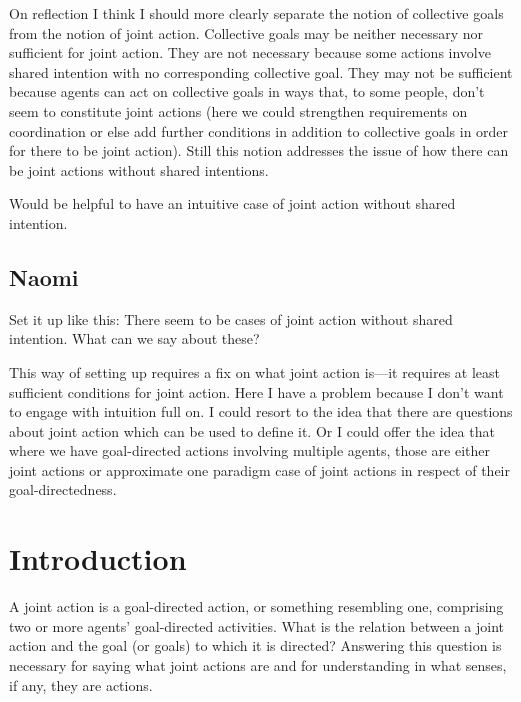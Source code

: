 \documentclass[12pt,a4paper]{extarticle}
\begin{document}
On reflection I think I should more clearly separate the notion of collective goals from the notion of joint action.
Collective goals may be neither necessary nor sufficient for joint action.
They are not necessary because some actions involve shared intention with no corresponding collective goal.
They may not be sufficient because agents can act on collective goals in ways that, to some people, don't seem to constitute joint actions (here we could strengthen requirements on coordination or else add further conditions in addition to collective goals in order for there to be joint action).
Still this notion addresses the issue of how there can be joint actions without shared intentions.

Would be helpful to have an intuitive case of joint action without shared intention.


\subsection{Naomi}
Set it up like this: 
There seem to be cases of joint action without shared intention.  
What can we say about these?

This way of setting up requires a fix on what joint action is---it requires at least sufficient conditions for joint action.
Here I have a problem because I don't want to engage with intuition full on.  
I could resort to the idea that there are questions about joint action which can be used to define it.  Or I could offer the idea that where we have goal-directed actions involving multiple agents, those are either joint actions or approximate one paradigm case of joint actions in respect of their goal-directedness.


\section{Introduction}
A joint action is a goal-directed action, or something resembling one, comprising two or more agents' goal-directed activities.  What is the relation between a joint action and the goal (or goals) to which it is directed?  
Answering this question is necessary for saying what joint actions are and for understanding in what senses, if any, they are actions.

\end{document}
